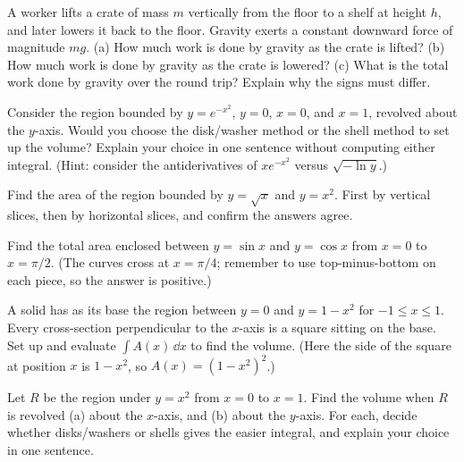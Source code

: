 \begin{exercise}
A worker lifts a crate of mass $m$ vertically from the floor to a shelf at height $h$,
and later lowers it back to the floor. Gravity exerts a constant downward force of magnitude
$mg$. (a) How much work is done by gravity as the crate is lifted? (b) How much work is done
by gravity as the crate is lowered? (c) What is the total work done by gravity over the round
trip? Explain why the signs must differ.
\end{exercise}

\begin{exercise}
Consider the region bounded by $y = e^{-x^2}$, $y = 0$, $x = 0$, and $x = 1$, revolved
about the $y$-axis. Would you choose the disk/washer method or the shell method to set up
the volume? Explain your choice in one sentence without computing either integral.
(Hint: consider the antiderivatives of $x e^{-x^2}$ versus $\sqrt{-\ln y}$.)
\end{exercise}

\begin{exercise}
Find the area of the region bounded by $y = \sqrt{x}$ and $y = x^2$. First by
vertical slices, then by horizontal slices, and confirm the answers agree.
\end{exercise}

\begin{exercise}
Find the total area enclosed between $y=\sin x$ and $y=\cos x$ from $x=0$ to
$x=\pi/2$. (The curves cross at $x=\pi/4$; remember to use top-minus-bottom on each
piece, so the answer is positive.)
\end{exercise}

\begin{exercise}
A solid has as its base the region between $y=0$ and $y = 1-x^2$ for $-1\le x\le 1$.
Every cross-section perpendicular to the $x$-axis is a square sitting on the base.
Set up and evaluate $\int A(x)\,\dd x$ to find the volume. (Here the side of the
square at position $x$ is $1-x^2$, so $A(x) = (1-x^2)^2$.)
\end{exercise}

\begin{exercise}
Let $R$ be the region under $y = x^2$ from $x=0$ to $x=1$. Find the volume when $R$
is revolved (a) about the $x$-axis, and (b) about the $y$-axis. For each, decide
whether disks/washers or shells gives the easier integral, and explain your choice
in one sentence.
\end{exercise}

